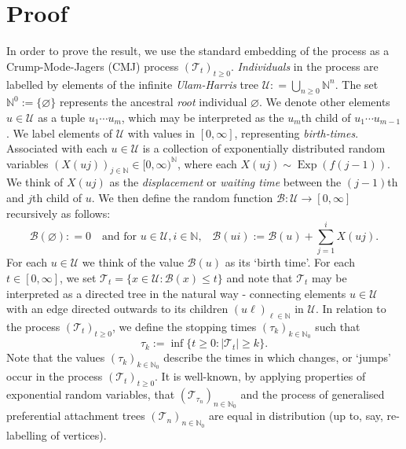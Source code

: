 \documentclass[12pt]{article}
\theoremstyle{definition}
\DeclareMathOperator{\exponentialrv}{Exp}
\newcommand{\Exp}[1]{\exponentialrv\left( #1 \right)}
\begin{document}
\section{Proof}
In order to prove the result, we use the standard embedding of the process as a Crump-Mode-Jagers (CMJ) process $(\mathscr{T}_{t})_{t \geq 0}$. \emph{Individuals} in the process are labelled by elements of the infinite \emph{Ulam-Harris} tree $\mathcal{U} : = \bigcup_{n \geq 0} \mathbb{N}^{n}$. The set $\mathbb{N}^{0} := \{\varnothing\}$ represents the ancestral \emph{root} individual $\varnothing$. We denote other elements $u \in \mathcal{U}$ as a tuple $u_1 \cdots u_m$, which may be interpreted as the $u_m$th child of $u_1 \cdots u_{m-1}$. We label elements of $\mathcal{U}$ with values in $[0, \infty]$, representing \emph{birth-times}. Associated with each $u \in \mathcal{U}$ is a collection of exponentially distributed random variables $(X(uj))_{j \in \mathbb{N}} \in [0,\infty)^\mathbb{N}$, where each $X(uj) \sim \Exp{f(j-1)}$. We think of $X(uj)$ as the \emph{displacement} or \emph{waiting time} between the $(j-1)$th and $j$th child of $u$. We then define 
the random function $\mathcal{B}\colon \mathcal{U} \rightarrow [0, \infty]$ recursively as follows:  
\[\mathcal{B}(\varnothing) : = 0 \quad \text{and for $u \in \mathcal{U}, i \in \mathbb{N}$,} \quad \mathcal{B}(ui) := \mathcal{B}(u) + \sum_{j=1}^{i} X(uj).\]
For each $u \in \mathcal{U}$ we think of the value $\mathcal{B}(u)$ as its `birth time'. For each $t \in [0, \infty]$, we set $\mathscr{T}_{t} = \{x \in \mathcal{U} \colon \mathcal{B}(x) \leq t\}$ and note that $\mathscr{T}_{t}$ may be interpreted as a directed tree in the natural way - connecting elements $u \in \mathcal{U}$ with an edge directed outwards to its children $(u \ell)_{\ell \in \mathbb{N}}$ in $\mathcal{U}$. In relation to the process $(\mathscr{T}_{t})_{t \geq 0}$, we define the stopping times $(\tau_{k})_{k \in \mathbb{N}_{0}}$ such that 
 \begin{equation} \label{eq:tau-k-def} 
 \tau_{k} := \inf\{t \geq 0\colon |\mathscr{T}_{t}| \geq k\}.
 \end{equation}
Note that the values $(\tau_{k})_{k \in \mathbb{N}_0}$ describe the times in which changes, or `jumps' occur in the process $(\mathscr{T}_{t})_{t \geq 0}$. It is well-known, by applying properties of exponential random variables, that $(\mathscr{T}_{\tau_{n}})_{n \in \mathbb{N}_{0}}$ and the process of generalised preferential attachment trees $(\mathcal{T}_{n})_{n \in \mathbb{N}_0}$ are equal in distribution (up to, say, re-labelling of vertices). 
\end{document}
